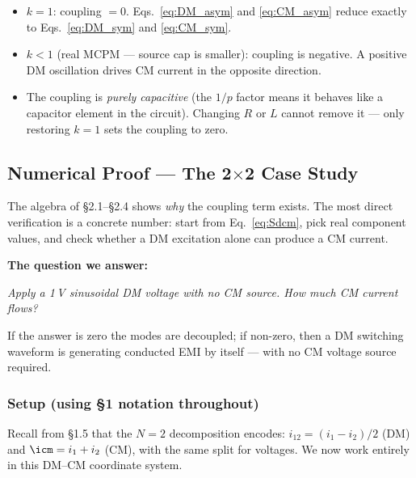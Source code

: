 \begin{warningbox}
\begin{itemize}
    \item $k = 1$: coupling $= 0$.  Eqs.~\eqref{eq:DM_asym} and
          \eqref{eq:CM_asym} reduce exactly to
          Eqs.~\eqref{eq:DM_sym} and \eqref{eq:CM_sym}. \checkmark
    \item $k < 1$ (real MCPM — source cap is smaller):
          coupling is negative.  A positive DM oscillation drives
          CM current in the opposite direction.
    \item The coupling is \emph{purely capacitive} (the $1/p$ factor
          means it behaves like a capacitor element in the circuit).
          Changing $R$ or $L$ cannot remove it — only restoring
          $k = 1$ sets the coupling to zero.
\end{itemize}
\end{warningbox}

\subsection{Numerical Proof — The 2\texorpdfstring{$\times$}{×}2
            Case Study}

The algebra of \S2.1--\S2.4 shows \emph{why} the coupling term exists.
The most direct verification is a concrete number: start from
Eq.~\eqref{eq:Sdcm}, pick real component values, and check whether
a DM excitation alone can produce a CM current.

\medskip
\textbf{The question we answer:}
\begin{center}
\emph{Apply a 1\,V sinusoidal DM voltage with no CM source.
      How much CM current flows?}
\end{center}
If the answer is zero the modes are decoupled; if non-zero, then a
DM switching waveform is generating conducted EMI by itself — with
no CM voltage source required.

\subsubsection*{Setup (using \S1 notation throughout)}

Recall from \S1.5 that the $N = 2$ decomposition encodes:
$i_{12} = (i_1 - i_2)/2$ (DM) and $\icm = i_1 + i_2$ (CM),
with the same split for voltages.
We now work entirely in this DM--CM coordinate system.

